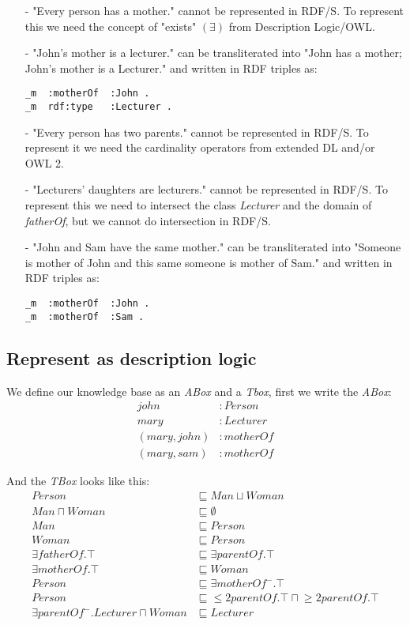 \documentclass[a4paper,12pt]{article}
\begin{document}
\begin{itemize}
\item[-]"Every person has a mother." cannot be represented in RDF/S.  To represent this
we need the concept of "exists" $(\exists)$ from Description Logic/OWL.

\item[-]"John’s mother is a lecturer." can be transliterated into "John has a mother;
John's mother is a Lecturer." and written in RDF triples as:
\begin{Verbatim}[samepage=true]
_m  :motherOf  :John .
_m  rdf:type   :Lecturer .
\end{Verbatim}

\item[-]"Every person has two parents." cannot be represented in RDF/S.  To represent
it we need the cardinality operators from extended DL and/or OWL 2.

\item[-]"Lecturers’ daughters are lecturers." cannot be represented in RDF/S.  To
represent this we need to intersect the class \emph{Lecturer} and the domain of
\emph{fatherOf}, but we cannot do intersection in RDF/S.

\item[-]"John and Sam have the same mother." can be transliterated into "Someone is
mother of John and this same someone is mother of Sam." and written in RDF
triples as:
\begin{Verbatim}[samepage=true]
_m  :motherOf  :John .
_m  :motherOf  :Sam .
\end{Verbatim}
\end{itemize}

\subsection[DL representation]{Represent as description logic}
We define our knowledge base as an \emph{ABox} and a \emph{Tbox}, first we
write the \emph{ABox}:
\begin{align*}
john         &: Person\\
mary         &: Lecturer\\
(mary, john) &: motherOf\\
(mary, sam)  &: motherOf
\end{align*}

And the \emph{TBox} looks like this:
\begin{align*}
               Person &\sqsubseteq Man \sqcup Woman\\
     Man \sqcap Woman &\sqsubseteq \emptyset\\
                  Man &\sqsubseteq Person\\
                Woman &\sqsubseteq Person\\
\exists fatherOf.\top &\sqsubseteq \exists parentOf.\top\\
\exists motherOf.\top &\sqsubseteq Woman\\
               Person &\sqsubseteq \exists motherOf^-.\top\\
Person &\sqsubseteq {}\leq2parentOf.\top {}\sqcap {}\geq2parentOf.\top\\
\exists parentOf^-.Lecturer \sqcap Woman &\sqsubseteq Lecturer
\end{align*}
\end{document}
